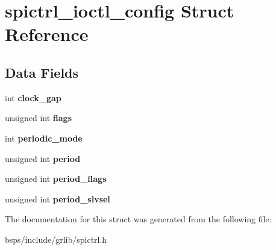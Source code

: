\hypertarget{structspictrl__ioctl__config}{}\section{spictrl\+\_\+ioctl\+\_\+config Struct Reference}
\label{structspictrl__ioctl__config}
\subsection*{Data Fields}
\begin{DoxyCompactItemize}
\item 
\mbox{\label{structspictrl__ioctl__config_aa4a79c36eb88de562c1f35087b670898}} 
int {\bfseries clock\+\_\+gap}
\item 
\mbox{\label{structspictrl__ioctl__config_a449e7106d84ecfa9043f995388cc0867}} 
unsigned int {\bfseries flags}
\item 
\mbox{\label{structspictrl__ioctl__config_a7b56c23903437a280295d32d9b652f48}} 
int {\bfseries periodic\+\_\+mode}
\item 
\mbox{\label{structspictrl__ioctl__config_ac9da2343cc441405c9025107e7dcf3f3}} 
unsigned int {\bfseries period}
\item 
\mbox{\label{structspictrl__ioctl__config_a74a3aff82ce2ead4fc0b6994246c3ebb}} 
unsigned int {\bfseries period\+\_\+flags}
\item 
\mbox{\label{structspictrl__ioctl__config_a8213d2bbe63c190bb3530aec5d0b5ad5}} 
unsigned int {\bfseries period\+\_\+slvsel}
\end{DoxyCompactItemize}


The documentation for this struct was generated from the following file\+:\begin{DoxyCompactItemize}
\item 
bsps/include/grlib/spictrl.\+h\end{DoxyCompactItemize}
